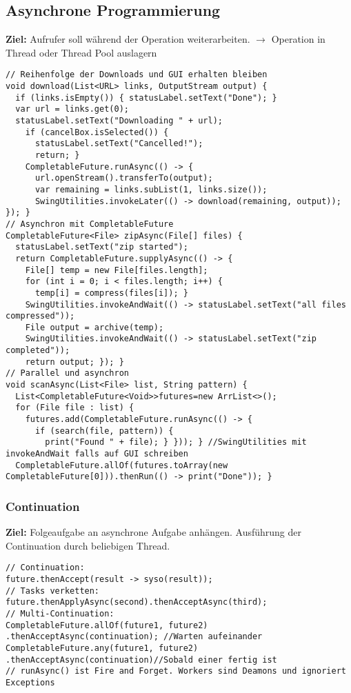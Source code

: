 \subsection{Asynchrone Programmierung}
\textcolor{b}{\textbf{Ziel:}} Aufrufer soll während der Operation weiterarbeiten. $\rightarrow$ Operation in Thread oder Thread Pool auslagern
\begin{lstlisting}
// Reihenfolge der Downloads und GUI erhalten bleiben
void download(List<URL> links, OutputStream output) {
  if (links.isEmpty()) { statusLabel.setText("Done"); }
  var url = links.get(0);
  statusLabel.setText("Downloading " + url);
    if (cancelBox.isSelected()) {
      statusLabel.setText("Cancelled!");
      return; }
    CompletableFuture.runAsync(() -> {
      url.openStream().transferTo(output);
      var remaining = links.subList(1, links.size());
      SwingUtilities.invokeLater(() -> download(remaining, output)); }); }
// Asynchron mit CompletableFuture
CompletableFuture<File> zipAsync(File[] files) {
  statusLabel.setText("zip started");
  return CompletableFuture.supplyAsync(() -> {
    File[] temp = new File[files.length];
    for (int i = 0; i < files.length; i++) {
      temp[i] = compress(files[i]); }
    SwingUtilities.invokeAndWait(() -> statusLabel.setText("all files compressed"));
    File output = archive(temp);
    SwingUtilities.invokeAndWait(() -> statusLabel.setText("zip completed"));
    return output; }); }
// Parallel und asynchron
void scanAsync(List<File> list, String pattern) {
  List<CompletableFuture<Void>>futures=new ArrList<>();
  for (File file : list) {
    futures.add(CompletableFuture.runAsync(() -> {
      if (search(file, pattern)) {
        print("Found " + file); } })); } //SwingUtilities mit invokeAndWait falls auf GUI schreiben
  CompletableFuture.allOf(futures.toArray(new
CompletableFuture[0])).thenRun(() -> print("Done")); }
\end{lstlisting}
\subsubsection{Continuation}
\textcolor{b}{\textbf{Ziel:}} Folgeaufgabe an asynchrone Aufgabe anhängen. Ausführung der Continuation durch beliebigen Thread.
\begin{lstlisting}
// Continuation:
future.thenAccept(result -> syso(result));
// Tasks verketten:
future.thenApplyAsync(second).thenAcceptAsync(third);
// Multi-Continuation:
CompletableFuture.allOf(future1, future2)
.thenAcceptAsync(continuation); //Warten aufeinander
CompletableFuture.any(future1, future2)
.thenAcceptAsync(continuation)//Sobald einer fertig ist
// runAsync() ist Fire and Forget. Workers sind Deamons und ignoriert Exceptions
\end{lstlisting}